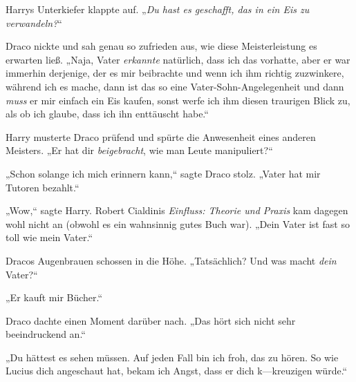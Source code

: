 Harrys Unterkiefer klappte auf. „\emph{Du hast es geschafft, \emph{das} in ein Eis zu verwandeln?}“

Draco nickte und sah genau so zufrieden aus, wie diese Meisterleistung es erwarten ließ. „Naja, Vater \emph{erkannte} natürlich, dass ich das vorhatte, aber er war immerhin derjenige, der es mir beibrachte und wenn ich ihm richtig zuzwinkere, während ich es mache, dann ist das so eine Vater-Sohn-Angelegenheit und dann \emph{muss} er mir einfach ein Eis kaufen, sonst werfe ich ihm diesen traurigen Blick zu, als ob ich glaube, dass ich ihn enttäuscht habe.“

Harry musterte Draco prüfend und spürte die Anwesenheit eines anderen Meisters. „Er hat dir \emph{beigebracht}, wie man Leute manipuliert?“

„Schon solange ich mich erinnern kann,“ sagte Draco stolz. „Vater hat mir Tutoren bezahlt.“

„Wow,“ sagte Harry. Robert Cialdinis \emph{Einfluss: Theorie und Praxis} kam dagegen wohl nicht an (obwohl es ein wahnsinnig gutes Buch war). „Dein Vater ist fast so toll wie mein Vater.“

Dracos Augenbrauen schossen in die Höhe. „Tatsächlich? Und was macht \emph{dein} Vater?“

„Er kauft mir Bücher.“

Draco dachte einen Moment darüber nach. „Das hört sich nicht sehr beeindruckend an.“

„Du hättest es sehen müssen. Auf jeden Fall bin ich froh, das zu hören. So wie Lucius dich angeschaut hat, bekam ich Angst, dass er dich k—kreuzigen würde.“

